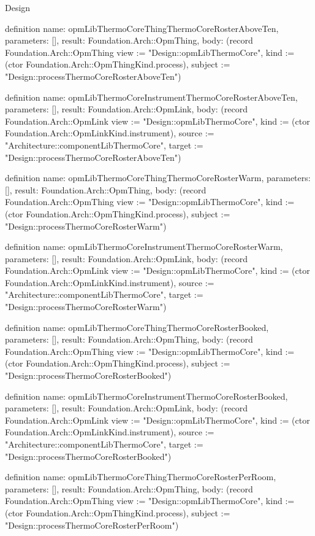 \begin{lexlean}{Design}
\begin{semanticmodule}
definition{
  name: opmLibThermoCoreThingThermoCoreRosterAboveTen,
  parameters: [],
  result: Foundation.Arch::OpmThing,
  body: (record Foundation.Arch::OpmThing {view := "Design::opmLibThermoCore", kind := (ctor Foundation.Arch::OpmThingKind.process), subject := "Design::processThermoCoreRosterAboveTen"})
}

definition{
  name: opmLibThermoCoreInstrumentThermoCoreRosterAboveTen,
  parameters: [],
  result: Foundation.Arch::OpmLink,
  body: (record Foundation.Arch::OpmLink {view := "Design::opmLibThermoCore", kind := (ctor Foundation.Arch::OpmLinkKind.instrument), source := "Architecture::componentLibThermoCore", target := "Design::processThermoCoreRosterAboveTen"})
}

definition{
  name: opmLibThermoCoreThingThermoCoreRosterWarm,
  parameters: [],
  result: Foundation.Arch::OpmThing,
  body: (record Foundation.Arch::OpmThing {view := "Design::opmLibThermoCore", kind := (ctor Foundation.Arch::OpmThingKind.process), subject := "Design::processThermoCoreRosterWarm"})
}

definition{
  name: opmLibThermoCoreInstrumentThermoCoreRosterWarm,
  parameters: [],
  result: Foundation.Arch::OpmLink,
  body: (record Foundation.Arch::OpmLink {view := "Design::opmLibThermoCore", kind := (ctor Foundation.Arch::OpmLinkKind.instrument), source := "Architecture::componentLibThermoCore", target := "Design::processThermoCoreRosterWarm"})
}

definition{
  name: opmLibThermoCoreThingThermoCoreRosterBooked,
  parameters: [],
  result: Foundation.Arch::OpmThing,
  body: (record Foundation.Arch::OpmThing {view := "Design::opmLibThermoCore", kind := (ctor Foundation.Arch::OpmThingKind.process), subject := "Design::processThermoCoreRosterBooked"})
}

definition{
  name: opmLibThermoCoreInstrumentThermoCoreRosterBooked,
  parameters: [],
  result: Foundation.Arch::OpmLink,
  body: (record Foundation.Arch::OpmLink {view := "Design::opmLibThermoCore", kind := (ctor Foundation.Arch::OpmLinkKind.instrument), source := "Architecture::componentLibThermoCore", target := "Design::processThermoCoreRosterBooked"})
}

definition{
  name: opmLibThermoCoreThingThermoCoreRosterPerRoom,
  parameters: [],
  result: Foundation.Arch::OpmThing,
  body: (record Foundation.Arch::OpmThing {view := "Design::opmLibThermoCore", kind := (ctor Foundation.Arch::OpmThingKind.process), subject := "Design::processThermoCoreRosterPerRoom"})
}


\end{semanticmodule}
\end{lexlean}
